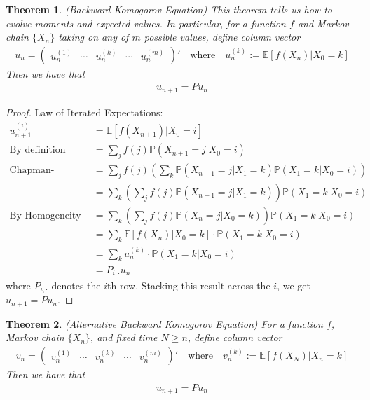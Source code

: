 \documentclass[12pt]{article}
\theoremstyle{plain}
\newtheorem{thm}{Theorem}[section]
\theoremstyle{definition}
\theoremstyle{remark}
\begin{document}
\begin{thm}{\emph{(Backward Komogorov Equation)}}
This theorem tells us how to evolve moments and expected values. In
particular, for a function $f$ and Markov chain $\{X_n\}$ taking on any
of $m$ possible values, define column vector
\begin{align*}
  u_n =
  \begin{pmatrix}
    u^{(1)}_n & \cdots & u^{(k)}_n & \cdots & u^{(m)}_n
  \end{pmatrix}'
  \quad\text{where}\quad
  u^{(k)}_n := \mathbb{E}[f(X_n)|X_0=k]
\end{align*}
Then we have that
\begin{align*}
  u_{n+1} = P u_n
\end{align*} \end{thm}
\begin{proof}
Law of Iterated Expectations:
\begin{align*}
  u_{n+1}^{(i)} &= \mathbb{E}[f(X_{n+1})|X_0=i]\\
  \text{By definition}\qquad
  &= \sum_j f(j) \mathbb{P}(X_{n+1}=j |X_0=i)\\
  \text{Chapman-Komogorov}\qquad
  &= \sum_j f(j) \left(\sum_k \mathbb{P}(X_{n+1}=j |X_1 = k)
              \mathbb{P}(X_1=k|X_0=i)\right)\\
  &= \sum_k \left(\sum_j f(j) \mathbb{P}(X_{n+1}=j |X_1 = k)\right)
          \mathbb{P}(X_1=k|X_0=i)\\
  \text{By Homogeneity}\qquad
  &= \sum_k \left(\sum_j f(j) \mathbb{P}(X_{n}=j |X_0 = k)\right)
          \mathbb{P}(X_1=k|X_0=i)\\
  &= \sum_k \mathbb{E}[f(X_n)|X_0=k] \cdot \mathbb{P}(X_1=k|X_0=i)\\
  &= \sum_k u^{(k)}_n \cdot \mathbb{P}(X_1=k|X_0=i)\\
  &= P_{i,\cdot} u_n
\end{align*}
where $P_{i,\cdot}$ denotes the $i$th row. Stacking this result across
the $i$, we get $u_{n+1}=Pu_n$.
\end{proof}

\begin{thm}{\emph{(Alternative Backward Komogorov Equation)}}
For a function $f$, Markov chain $\{X_n\}$, and fixed time $N\geq n$,
define column vector
\begin{align*}
  v_n =
  \begin{pmatrix}
    v^{(1)}_n & \cdots & v^{(k)}_n & \cdots & v^{(m)}_n
  \end{pmatrix}'
  \quad\text{where}\quad
  v^{(k)}_n := \mathbb{E}[f(X_N)|X_n=k]
\end{align*}
Then we have that
\begin{align*}
  u_{n+1} = P u_n
\end{align*}
\end{thm}
\end{document}

